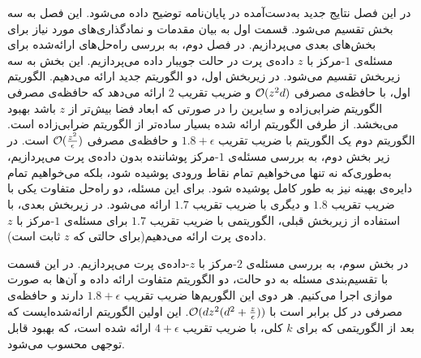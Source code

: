 

در این فصل نتایج جدید به‌دست‌آمده در پایان‌نامه توضیح داده می‌شود. این فصل به سه بخش تقسیم می‌شود. قسمت اول به بیان مقدمات و نمادگذاری‌های مورد نیاز برای بخش‌های بعدی می‌پردازیم. در فصل دوم، به بررسی راه‌حل‌های ارائه‌شده برای مسئله‌ی $1$-مرکز با $z$ داده‌ی پرت در حالت جویبار داده می‌پردازیم. این بخش به سه زیربخش تقسیم می‌شود. در زیربخش اول، دو الگوریتم جدید ارائه می‌دهیم. الگوریتم اول، با حافظه‌ی مصرفی $\mathcal{O}(z^2d)$ و ضریب تقریب $2$ ارائه می‌دهد که حافظه‌ی مصرفی الگوریتم ضرابی‌زاده و سایرین  را در صورتی که ابعاد فضا بیش‌تر از $z$ باشد بهبود می‌بخشد. از طرفی الگوریتم ارائه شده بسیار ساده‌تر از الگوریتم ضرابی‌زاده است. الگوریتم دوم یک الگوریتم با ضریب تقریب $1.8 + \epsilon$ و حافظه‌ی مصرفی $\mathcal{O}(\frac{z^2}{\epsilon})$ است. در زیر بخش دوم، به بررسی مسئله‌ی $1$-مرکز پوشاننده بدون داده‌ی پرت می‌پردازیم، به‌طوری‌که نه تنها می‌خواهیم تمام نقاط ورودی پوشیده شود، بلکه می‌خواهیم تمام دایره‌ی بهینه نیز به طور کامل پوشیده شود. برای این مسئله، دو راه‌حل متفاوت یکی با ضریب تقریب $1.8$ و دیگری با ضریب تقریب $1.7$ ارائه می‌شود. در زیربخش بعدی، با استفاده از زیربخش قبلی، الگوریتمی با ضریب تقریب $1.7$ برای مسئله‌ی $1$-مرکز با $z$ داده‌ی پرت ارائه می‌دهیم(برای حالتی که $z$ ثابت است). 

در بخش سوم، به بررسی مسئله‌ی $2$-مرکز با $z$-داده‌ی پرت می‌پردازیم. در این قسمت با تقسیم‌بندی مسئله به دو حالت، دو الگوریتم متفاوت ارائه داده و آن‌ها به صورت موازی اجرا می‌کنیم. هر دوی این الگوریم‌ها ضریب تقریب $1.8 + \epsilon$ دارند و حافظه‌ی مصرفی در کل برابر است با 
$\mathcal{O}(dz^2 (d^2 + \frac{z}{\epsilon}))$.
این اولین الگوریتم ارائه‌شده‌ایست که بعد از الگوریتمی که برای $k$ کلی، با ضریب تقریب $4+\epsilon$ ارائه شده است، که بهبود قابل توجهی محسوب می‌شود.
















